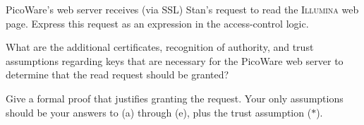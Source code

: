 \begin{exercise}[\synthesis]
  \begin{list}{()}%
    {\addtocounter{count}{\therestart}}%
  \item \textsf{PicoWare}'s web server receives (via SSL) Stan's request
    to read the \textsc{Illumina} web page.  Express this request as an
    expression in the access-control logic.  
  \item What are the additional certificates,
      recognition of authority, and trust assumptions regarding keys
    that are necessary for the \textsf{PicoWare} web server to determine that
    the read request should be granted? %
  \item Give a formal proof that justifies granting the request.
    Your only assumptions should be your answers to (a) through (e),
    plus the trust assumption ($\ast$).  
  \end{list}
\end{exercise}

